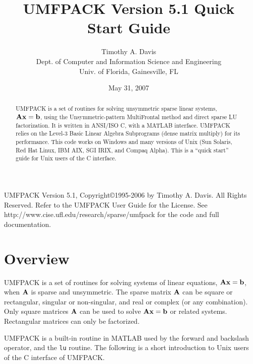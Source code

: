 \documentclass[11pt]{article}
\newcommand{\m}[1]{{\bf{#1}}}       %
\begin{document}
\author{Timothy A. Davis \\
Dept. of Computer and Information Science and Engineering \\
Univ. of Florida, Gainesville, FL}
\title{UMFPACK Version 5.1 Quick Start Guide}
\date{May 31, 2007}
\maketitle

\begin{abstract}
    UMFPACK is a set of routines for solving unsymmetric sparse linear
    systems, $\m{Ax}=\m{b}$, using the Unsymmetric-pattern MultiFrontal method
    and direct sparse LU factorization.  It is written in ANSI/ISO C, with a
    MATLAB interface.  UMFPACK relies on the Level-3
    Basic Linear Algebra Subprograms (dense matrix multiply) for its
    performance.  This code works on Windows and many versions of Unix (Sun
    Solaris, Red Hat Linux, IBM AIX, SGI IRIX, and Compaq Alpha).
    This is a ``quick start'' guide for Unix users of the C interface.
\end{abstract}

UMFPACK Version 5.1, Copyright\copyright 1995-2006 by Timothy A. Davis.
All Rights Reserved.  Refer to the UMFPACK User Guide
for the License. See \newline
http://www.cise.ufl.edu/research/sparse/umfpack
for the code and full documentation.

\section{Overview}

UMFPACK is a set of routines for solving systems of linear
equations, $\m{Ax}=\m{b}$, when $\m{A}$ is sparse and unsymmetric.
The sparse matrix $\m{A}$ can be square or rectangular, singular
or non-singular, and real or complex (or any combination).  Only square
matrices $\m{A}$ can be used to solve $\m{Ax}=\m{b}$ or related systems.
Rectangular matrices can only be factorized.

UMFPACK is a built-in routine in MATLAB used by the forward and
backslash operator, and the {\tt lu} routine.
The following is a short
introduction to Unix users of the C interface of UMFPACK.
\end{document}
